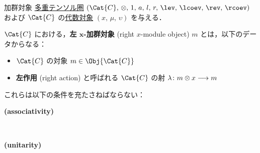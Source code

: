 \documentclass[TQFT_main]{subfiles}
\begin{document}
\begin{mydef}[label=def:moduleobj,breakable]{加群対象}
    \hyperref[def:tensorfusion-cat]{多重テンソル圏} $(\Cat{C},\, \otimes,\, 1,\, a,\, l,\, r,\, \lev,\, \lcoev,\, \rev,\, \rcoev)$ 
    および $\Cat{C}$ の\hyperref[def:algobj]{代数対象} $(x,\, \mu,\, \upsilon)$ を与える．
    
    $\Cat{C}$ における，\textbf{左 $\bm{x}$-加群対象} (right $x$-module object) $m$ とは，以下のデータからなる：
    \begin{itemize}
        \item $\Cat{C}$ の対象 $m \in \Obj{\Cat{C}}$ 
        \item \textbf{左作用} (right action) と呼ばれる $\Cat{C}$ の射 $\lambda \colon m \otimes x \longrightarrow m$
    \end{itemize}
    これらは以下の条件を充たさねばならない：
    \begin{description}
        \item[\textbf{(associativity)}]　 
        
        \begin{center}
        \end{center}

        \item[\textbf{(unitarity)}]　 
        \begin{center}
        \end{center}
        
    \end{description}
    

\end{mydef}
\end{document}
